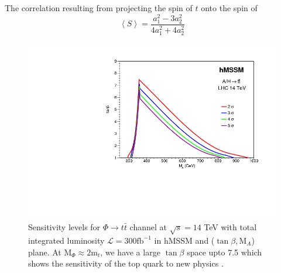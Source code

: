 The correlation resulting from projecting the spin of $t$ onto the spin of \cite{Berge:2008dr, PhysRevD.58.114031}
\begin{equation}
\left\langle S \right\rangle = \frac{a_{1}^{2}-3a_{2}^{2}}{4a_{1}^{2}+4a_{2}^{2}}
\end{equation}\label{equ:tt_spin}
\begin{figure}[htbp]
\centering
\includegraphics[trim={8cm 6.0cm 0 0},clip, scale=0.6]{fig/chapt2/plots_constraints_LHC14_300_AH_tt.png}
\caption{Sensitivity levels for $\Phi\rightarrow t\bar{t}$ channel at $\sqrt{s}=14$ TeV with total integrated luminosity $\mathcal{L}=300 \text{f}\text{b}^{-1}$ in hMSSM and ($\tan\beta, \text{M}_{A}$) plane. At M$_{\Phi} \approx 2\text{m}_{t}$, we have a large $\tan\beta$ space upto 7.5 which shows the sensitivity of the top quark to new physics \cite{Djouadi:2015jea}. }\label{fig:Htt_sensitivity}
\end{figure}


